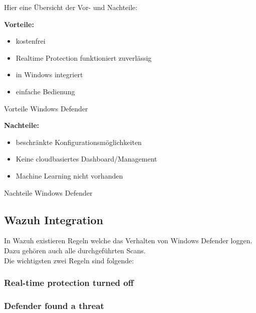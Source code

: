 \newpage

Hier eine Übersicht der Vor- und Nachteile:\\

\begin{minipage}{\linewidth}
    \begin{multicols}{2}
        \begin{table}[H]
            \begin{center}
                \textbf{Vorteile:}
                \begin{itemize}
                    \item kostenfrei
                    \item Realtime Protection funktioniert zuverlässig
                    \item in Windows integriert
                    \item einfache Bedienung
                \end{itemize}
            \end{center}
            \caption{Vorteile Windows Defender}
        \end{table}
        \begin{table}[H]
            \begin{center}
                \textbf{Nachteile:}
                \begin{itemize}
                    \item beschränkte Konfigurationsmöglichkeiten
                    \item Keine cloudbasiertes Dashboard/Management
                    \item Machine Learning nicht vorhanden
                \end{itemize}
            \end{center}
            \caption{Nachteile Windows Defender}
        \end{table}
    \end{multicols}
\end{minipage}




\subsection{Wazuh Integration}
In Wazuh existieren Regeln welche das Verhalten von Windows Defender loggen.
Dazu gehören auch alle durchgeführten Scans.\\

Die wichtigsten zwei Regeln sind folgende:\\
\subsubsection{Real-time protection turned off}
\subsubsection{Defender found a threat}